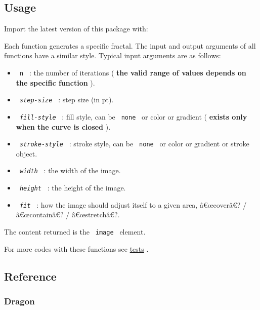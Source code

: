 \subsection{Usage}\label{usage}

Import the latest version of this package with:

\begin{Shaded}
\begin{Highlighting}[]
\end{Highlighting}
\end{Shaded}

Each function generates a specific fractal. The input and output
arguments of all functions have a similar style. Typical input arguments
are as follows:

\begin{itemize}
\tightlist
\item
  \texttt{\ n\ } : the number of iterations ( \textbf{the valid range of
  values depends on the specific function} ).
\item
  \emph{\texttt{\ step-size\ }} : step size (in pt).
\item
  \emph{\texttt{\ fill-style\ }} : fill style, can be \texttt{\ none\ }
  or color or gradient ( \textbf{exists only when the curve is closed}
  ).
\item
  \emph{\texttt{\ stroke-style\ }} : stroke style, can be
  \texttt{\ none\ } or color or gradient or stroke object.
\item
  \emph{\texttt{\ width\ }} : the width of the image.
\item
  \emph{\texttt{\ height\ }} : the height of the image.
\item
  \emph{\texttt{\ fit\ }} : how the image should adjust itself to a
  given area, â€œcoverâ€? / â€œcontainâ€? / â€œstretchâ€?.
\end{itemize}

The content returned is the \texttt{\ image\ } element.

For more codes with these functions see
\href{https://github.com/typst/packages/raw/main/packages/preview/fractusist/0.1.0/tests}{tests}
.

\subsection{Reference}\label{reference}

\subsubsection{Dragon}\label{dragon}

